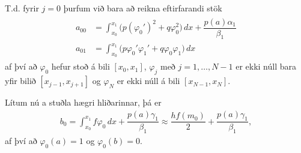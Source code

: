 \documentclass[a4paper,10pt,icelandic]{sphinxmanual}
\begin{document}
T.d. fyrir \(j=0\) þurfum við bara að reikna eftirfarandi stök
\begin{equation*}
\begin{split}\begin{aligned}
a_{00}&=\int_{x_0}^{x_1}\big(p(\varphi_0')^2+q\varphi_0^2\big)\, dx+
\dfrac{p(a)\alpha_1}{\beta_1}
\\
a_{01}&=
\int_{x_0}^{x_1}\big(p\varphi_0'\varphi_1'+q\varphi_0\varphi_1\big)\,
dx
\end{aligned}\end{split}
\end{equation*}
af því að \(\varphi_0\) hefur stoð á bili \([x_0,x_1]\), \(\varphi_j\) með \(j=1, \dots, N-1\) er ekki núll bara yfir bilið \([x_{j-1},x_{j+1}]\) og \(\varphi_N\) er ekki núll á bili \([x_{N-1},x_{N}]\).

Lítum nú a stuðla hægri hliðarinnar, þá er
\begin{equation*}
\begin{split}b_0=\int_{x_0}^{x_1}f\varphi_0\, dx+\dfrac{p(a)\gamma_1}{\beta_1}
\approx \dfrac{h f(m_0)}2+\dfrac{p(a)\gamma_1}{\beta_1},\end{split}
\end{equation*}
af því að \(\varphi_0(a)=1\) og \(\varphi_0(b)=0\).
\end{document}
